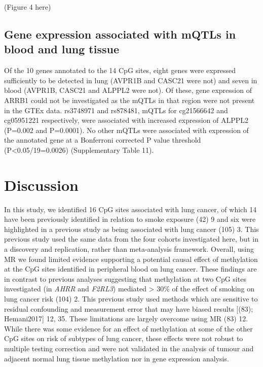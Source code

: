\documentclass[11pt,twoside]{bristolthesis}
\begin{document}
(Figure 4 here)

\hypertarget{gene-expression-associated-with-mqtls-in-blood-and-lung-tissue}{%
\subsection{Gene expression associated with mQTLs in blood and lung tissue}\label{gene-expression-associated-with-mqtls-in-blood-and-lung-tissue}}

Of the 10 genes annotated to the 14 CpG sites, eight genes were expressed sufficiently to be detected in lung (AVPR1B and CASC21 were not) and seven in blood (AVPR1B, CASC21 and ALPPL2 were not). Of these, gene expression of ARRB1 could not be investigated as the mQTLs in that region were not present in the GTEx data. rs3748971 and rs878481, mQTLs for cg21566642 and cg05951221 respectively, were associated with increased expression of ALPPL2 (P=0.002 and P=0.0001). No other mQTLs were associated with expression of the annotated gene at a Bonferroni corrected P value threshold (P\textless0.05/19=0.0026) (Supplementary Table 11).

\hypertarget{discussion-1}{%
\section{Discussion}\label{discussion-1}}

In this study, we identified 16 CpG sites associated with lung cancer, of which 14 have been previously identified in relation to smoke exposure (42) 9 and six were highlighted in a previous study as being associated with lung cancer (105) 3. This previous study used the same data from the four cohorts investigated here, but in a discovery and replication, rather than meta-analysis framework. Overall, using MR we found limited evidence supporting a potential causal effect of methylation at the CpG sites identified in peripheral blood on lung cancer. These findings are in contrast to previous analyses suggesting that methylation at two CpG sites investigated (in \emph{AHRR} and \emph{F2RL3}) mediated \textgreater{} 30\% of the effect of smoking on lung cancer risk (104) 2. This previous study used methods which are sensitive to residual confounding and measurement error that may have biased results {[}(83); Hemani2017{]} 12, 35. These limitations are largely overcome using MR (83) 12. While there was some evidence for an effect of methylation at some of the other CpG sites on risk of subtypes of lung cancer, these effects were not robust to multiple testing correction and were not validated in the analysis of tumour and adjacent normal lung tissue methylation nor in gene expression analysis.
\end{document}
